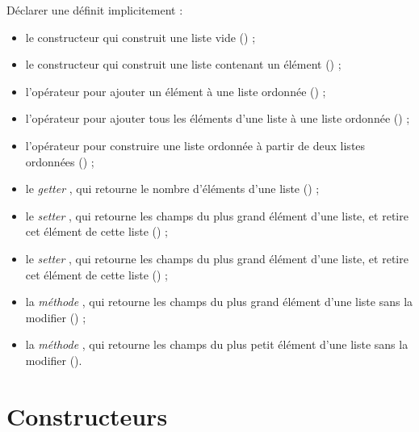 Déclarer une  définit implicitement :
\begin{itemize}
  \item le constructeur  qui construit une liste vide () ;
  \item le constructeur  qui construit une liste contenant un élément () ;
  \item l'opérateur \galgas{+=} pour ajouter un élément à une liste ordonnée () ;
  \item l'opérateur  pour ajouter tous les éléments d'une liste à une liste ordonnée () ;
  \item l'opérateur  pour construire une liste ordonnée à partir de deux listes ordonnées () ;
  \item le \emph{getter} , qui retourne le nombre d'éléments d'une liste () ;
  \item le \emph{setter} , qui retourne les champs du plus grand élément d'une liste, et retire cet élément de cette liste () ;
  \item le \emph{setter} , qui retourne les champs du plus grand élément d'une liste, et retire cet élément de cette liste () ;
  \item la \emph{méthode} , qui retourne les champs du plus grand élément d'une liste sans la modifier () ;
  \item la \emph{méthode} , qui retourne les champs du plus petit élément d'une liste sans la modifier ().
\end{itemize}








\section{Constructeurs}


